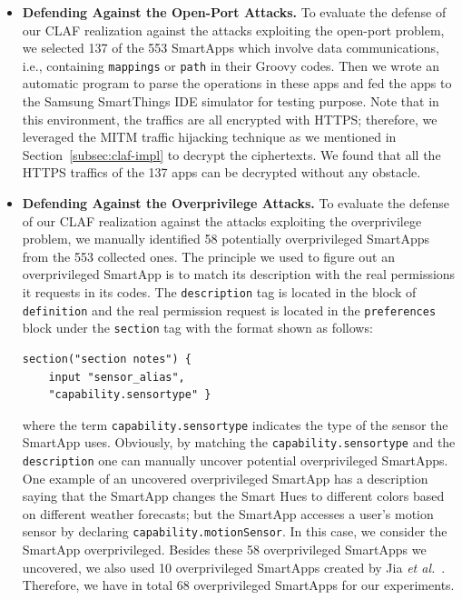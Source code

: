 \documentclass[letterpaper,12pt]{article}
\begin{document}
\begin{itemize}

\item \textbf{Defending Against the Open-Port Attacks.} 
To evaluate the defense of our CLAF realization against the attacks  exploiting the open-port problem, we selected 137 of the 553 SmartApps which involve data communications, i.e., containing \texttt{mappings} or \texttt{path} in their Groovy codes. Then we wrote an automatic program to parse the operations in these apps and fed the apps to the Samsung SmartThings IDE simulator for testing purpose. Note that in this environment, the traffics are all encrypted with HTTPS; therefore, we leveraged the MITM traffic hijacking technique as we mentioned in Section~\ref{subsec:claf-impl} to decrypt the ciphertexts. We found that all the HTTPS traffics of the 137 apps can be decrypted without any obstacle.

\item \textbf{Defending Against the Overprivilege Attacks.} 
To evaluate the defense of our CLAF realization against the attacks exploiting the overprivilege problem, we manually identified 58 potentially overprivileged SmartApps from the 553 collected ones. The principle we used to figure out an overprivileged SmartApp is to match its description with the real permissions it requests in its codes. The \texttt{description} tag is located  in the block of \texttt{definition} and the real permission request is located in the \texttt{preferences} block under the \texttt{section} tag with the format shown as follows:
\begin{lstlisting}
section("section notes") {
    input "sensor_alias", 
    "capability.sensortype" }
\end{lstlisting}
where the term \texttt{capability.sensortype} indicates the type of the sensor the SmartApp uses. Obviously, by matching the \texttt{capability.sensortype} and the \texttt{description} one can manually uncover potential overprivileged SmartApps. One example of an uncovered overprivileged SmartApp has a description saying that the SmartApp changes the Smart Hues to different colors based on different weather forecasts; but the SmartApp accesses a user's motion sensor by declaring \texttt{capability.motionSensor}. In this case, we consider the SmartApp overprivileged. Besides these 58 overprivileged SmartApps we uncovered, we also used 10 overprivileged SmartApps created by Jia \emph{et al.}~\cite{jia2017contexiot}. Therefore, we have in total 68 overprivileged SmartApps for our experiments.
\end{itemize}
\end{document}
